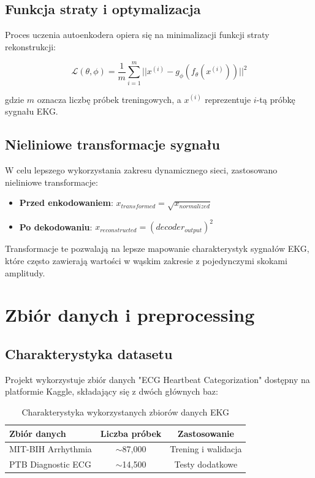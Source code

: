 \documentclass[12pt,a4paper]{article}
\begin{document}
\subsection{Funkcja straty i optymalizacja}

Proces uczenia autoenkodera opiera się na minimalizacji funkcji straty rekonstrukcji:

\begin{equation}
\mathcal{L}(\theta, \phi) = \frac{1}{m} \sum_{i=1}^{m} ||x^{(i)} - g_{\phi}(f_{\theta}(x^{(i)}))||^2
\end{equation}

gdzie $m$ oznacza liczbę próbek treningowych, a $x^{(i)}$ reprezentuje $i$-tą próbkę sygnału EKG.

\subsection{Nieliniowe transformacje sygnału}

W celu lepszego wykorzystania zakresu dynamicznego sieci, zastosowano nieliniowe transformacje:
\begin{itemize}
    \item \textbf{Przed enkodowaniem}: $x_{transformed} = \sqrt{x_{normalized}}$
    \item \textbf{Po dekodowaniu}: $x_{reconstructed} = (decoder_{output})^2$
\end{itemize}

Transformacje te pozwalają na lepsze mapowanie charakterystyk sygnałów EKG, które często zawierają wartości w wąskim zakresie z pojedynczymi skokami amplitudy.

\section{Zbiór danych i preprocessing}

\subsection{Charakterystyka datasetu}

Projekt wykorzystuje zbiór danych "ECG Heartbeat Categorization" dostępny na platformie Kaggle, składający się z dwóch głównych baz:

\begin{table}[H]
\centering
\begin{tabular}{@{}lcc@{}}
\toprule
\textbf{Zbiór danych} & \textbf{Liczba próbek} & \textbf{Zastosowanie} \\
\midrule
MIT-BIH Arrhythmia & $\sim$87,000 & Trening i walidacja \\
PTB Diagnostic ECG & $\sim$14,500 & Testy dodatkowe \\
\bottomrule
\end{tabular}
\caption{Charakterystyka wykorzystanych zbiorów danych EKG}
\end{table}
\end{document}
